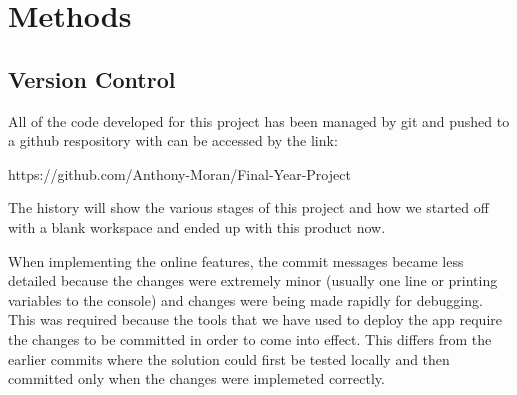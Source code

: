 \chapter{Methods}
\label{chapter2}

\section{Version Control}
All of the code developed for this project has been managed by git and pushed to a github respository with can be accessed by the link:

\begin{center}
    https://github.com/Anthony-Moran/Final-Year-Project
\end{center}

The history will show the various stages of this project and how we started off with a blank workspace and ended up with this product now.

When implementing the online features, the commit messages became less detailed because the changes were extremely minor (usually one line or printing variables to the console) and changes were being made rapidly for debugging. This was required because the tools that we have used to deploy the app require the changes to be committed in order to come into effect. This differs from the earlier commits where the solution could first be tested locally and then committed only when the changes were implemeted correctly.


